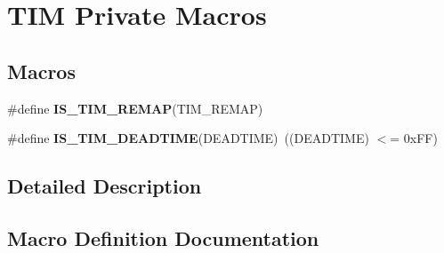 \hypertarget{group___t_i_m_ex___private___macros}{}\section{T\+IM Private Macros}
\label{group___t_i_m_ex___private___macros}
\subsection*{Macros}
\begin{DoxyCompactItemize}
\item 
\#define {\bfseries I\+S\+\_\+\+T\+I\+M\+\_\+\+R\+E\+M\+AP}(T\+I\+M\+\_\+\+R\+E\+M\+AP)
\item 
\#define {\bfseries I\+S\+\_\+\+T\+I\+M\+\_\+\+D\+E\+A\+D\+T\+I\+ME}(D\+E\+A\+D\+T\+I\+ME)~((D\+E\+A\+D\+T\+I\+ME) $<$= 0x\+F\+F)\hypertarget{group___t_i_m_ex___private___macros_gadba462318422eb55d14d477332be9274}{}\label{group___t_i_m_ex___private___macros_gadba462318422eb55d14d477332be9274}

\end{DoxyCompactItemize}


\subsection{Detailed Description}


\subsection{Macro Definition Documentation}
